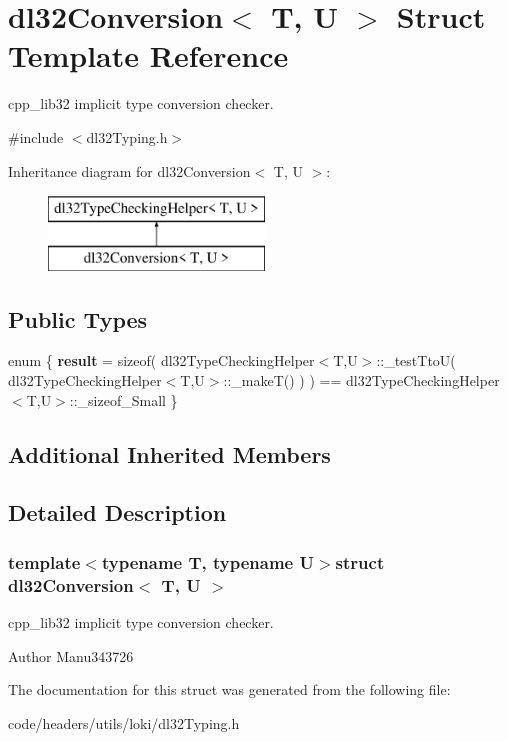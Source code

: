 \hypertarget{structdl32_conversion}{\section{dl32\-Conversion$<$ T, U $>$ Struct Template Reference}
\label{structdl32_conversion}
}


cpp\-\_\-lib32 implicit type conversion checker.  




{\ttfamily \#include $<$dl32\-Typing.\-h$>$}

Inheritance diagram for dl32\-Conversion$<$ T, U $>$\-:\begin{figure}[H]
\begin{center}
\leavevmode
\includegraphics[height=2.000000cm]{structdl32_conversion}
\end{center}
\end{figure}
\subsection*{Public Types}
\begin{DoxyCompactItemize}
\item 
enum \{ {\bfseries result} = sizeof( dl32\-Type\-Checking\-Helper$<$T,U$>$\-:\-:\-\_\-test\-Tto\-U( dl32\-Type\-Checking\-Helper$<$T,U$>$\-:\-:\-\_\-make\-T() ) ) == dl32\-Type\-Checking\-Helper$<$T,U$>$\-:\-:\-\_\-sizeof\-\_\-\-Small
 \}
\end{DoxyCompactItemize}
\subsection*{Additional Inherited Members}


\subsection{Detailed Description}
\subsubsection*{template$<$typename T, typename U$>$struct dl32\-Conversion$<$ T, U $>$}

cpp\-\_\-lib32 implicit type conversion checker. 

\begin{DoxyAuthor}{Author}
Manu343726 
\end{DoxyAuthor}


The documentation for this struct was generated from the following file\-:\begin{DoxyCompactItemize}
\item 
code/headers/utils/loki/dl32\-Typing.\-h\end{DoxyCompactItemize}
